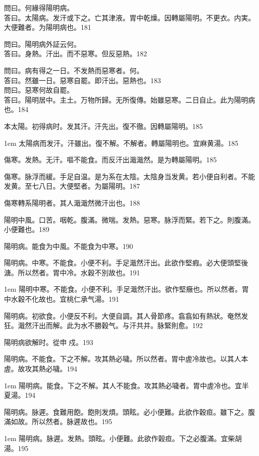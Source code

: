 問曰。何緣得陽明病。\\
答曰。太陽病。发汗或下之。亡其津液。胃中乾燥。因轉屬陽明。不更衣。内実。大便難者。为陽明病也。181

問曰。陽明病外証云何。\\
答曰。身熱。汗出。而不惡寒。{\khaaitp 但}反惡熱。182

問曰。病有得之一日。不发熱而惡寒者。何。\\
答曰。然雖一日。惡寒自罷。即汗出。惡熱也。183\\
問曰。惡寒何故自罷。\\
答曰。陽明居中。主土。万物所歸。无所復傳。始雖惡寒。二日自止。此为陽明病也。184

本太陽。初得病时。发其汗。汗先出{\khaaitp 。復}不徹。因轉屬陽明。185

\hangindent 1em
太陽病而发汗。汗雖出。復不解。不解者。轉屬陽明也。宜麻黄湯。{\gaoben}185

傷寒。发熱。无汗。嘔不能食。而反汗出濈濈然。是为轉屬陽明。185

傷寒。脉浮而緩。手足自温。是为系在太陰。太陰{\khaaitp 身}当发黄。若小便自利者。不能发黄。至七八日。大便堅者。为屬陽明。187

傷寒轉系陽明者。其人濈濈然微汗出也。188

陽明中風。口苦。咽乾。腹滿。微喘。发熱。惡寒。脉浮而緊。若下之。則腹滿。小便難也。189

陽明病。能食为中風。不能食为中寒。190

陽明{\khaaitp 病。}中寒。不能食。小便不利。手足濈然汗出。此欲作堅瘕。必大便頭堅後溏。所以然者。胃中冷。水穀不別故也。191

\hangindent 1em
陽明中寒。不能食。小便不利。手足濈然汗出。欲作堅癥也。所以然者。胃中水穀不化故也。宜桃仁承气湯。{\gaoben}191

陽明病。初欲食。小便反不利。大便自調。其人骨節疼。翕翕如有熱狀。奄然发狂。濈然汗出而解。此为水不勝穀气。与汗共并。脉緊則愈。192

陽明病欲解时。從申{\sungtpii 𥁞}戍。193

陽明病。不能食。下之不解。攻其熱必噦。所以然者。胃中虗冷故也。{\khaaitp 以其人本虗。故攻其熱必噦。}194

\hangindent 1em
陽明病。能食。下之不解。其人不能食。攻其熱必噦者。胃中虗冷也。宜半夏湯。{\gaoben}194

陽明病。脉遲。食難用飽。飽則发煩。頭眩。必小便難。此欲作穀疸。雖下之。腹滿如故。所以然者。脉遲故也。195

\hangindent 1em
陽明病。脉遲。发熱。頭眩。小便難。此欲作榖疸。下之必腹滿。宜柴胡湯。{\gaoben}195

